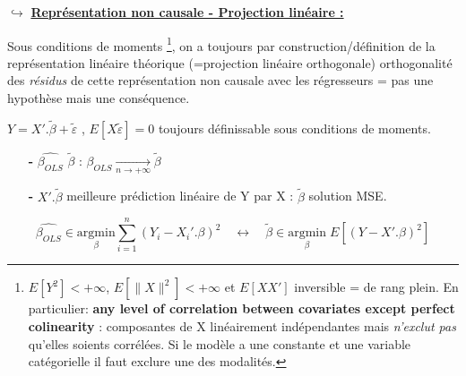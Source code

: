 \noindent $\hookrightarrow$ \underline{\textbf{Représentation non causale - Projection linéaire :}}\par
Sous conditions de moments \footnote{$E[Y^{2}]<+\infty$, $E[\lVert X \rVert^{2}]<+\infty$ et $E[XX']$ inversible = de rang plein. En particulier: \textbf{any level of correlation between covariates except perfect colinearity} : composantes de X linéairement indépendantes mais \textit{n'exclut pas} qu'elles soients corrélées. Si le modèle a une constante et une variable catégorielle il faut exclure une des modalités.}, on a toujours par construction/définition de la représentation linéaire théorique (=projection linéaire orthogonale) orthogonalité des \textit{résidus} de cette représentation non causale avec les régresseurs = pas une hypothèse mais une conséquence.\par
\begin{boxH}
    $Y = X'.\widetilde{\beta} + \widetilde{\varepsilon}$ , $E[X\widetilde{\varepsilon}]=0$ toujours définissable sous conditions de moments.\par
    \begin{itemize}
        \item[\textbf{-}] $\widehat{\beta_{OLS}}$  $\widetilde{\beta}$ : $\widehat{\beta_{OLS}} \underset{n \to +\infty}{\longrightarrow} \widetilde{\beta}$\par
        \item[\textbf{-}] $X'.\widetilde{\beta}$ meilleure prédiction linéaire de Y par X : $\widetilde{\beta}$ solution MSE.
    \end{itemize}
\end{boxH}

\begin{equation*} 
    \widehat{\beta_{OLS}} \in \underset{\beta}{\mathrm{argmin}} \sum_{i = 1}^{n}{(Y_{i} - X_{i}'.\beta)^{2}} \quad \longleftrightarrow \quad \widetilde{\beta} \in \underset{\beta}{\mathrm{argmin}} \; E[(Y-X'.\beta)^{2}]
\end{equation*}

